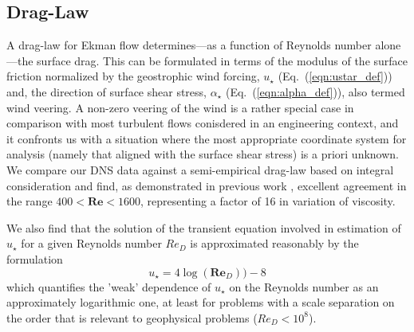 \documentclass[a4paper,11pt]{amsart}
\begin{document}
\subsection{Drag-Law}
\label{sec:drag-law}
A drag-law for Ekman flow determines---as a function of Reynolds number alone---the surface drag.
%
This can be formulated in terms of the modulus
of the surface friction normalized by the geostrophic wind forcing, $u_\star$ (Eq.~(\ref{eqn:ustar_def}))
and, the direction of surface shear stress, $\alpha_\star$ (Eq.~(\ref{eqn:alpha_def})),
also termed wind veering. 
%
A non-zero veering of the wind is a rather special case in comparison with most turbulent flows conisdered in an
engineering context, and it confronts us with a situation where the most appropriate coordinate system
for analysis (namely that aligned with the surface shear stress) is a priori unknown. 
%
We compare our DNS data against a semi-empirical drag-law based on integral consideration \cite{spalart:JFM1989}
and find, as demonstrated in previous work \cite{ansorge:BM2014}, excellent agreement in the range
 $400<\mathbf{Re}<1600$, representing a factor of 16 in variation of viscosity. 
%
\par
%
We also find that the solution of the transient equation involved in estimation of $u_\star$ for a given Reynolds number
$Re_D$ is approximated reasonably by the formulation
\begin{equation}
  u_\star= 4\log(\mathbf{Re}_D))-8
\end{equation}
which quantifies the 'weak' dependence of $u_\star$ on the Reynolds number as an approximately logarithmic one, at least
for problems with a scale separation on the order that is relevant to geophysical problems ($Re_D<10^{8}$).  
%
%
\end{document}
